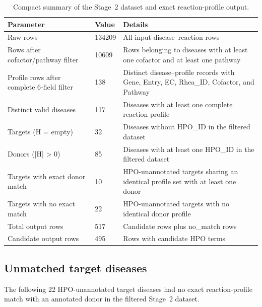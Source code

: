 \begin{table}[htbp]
\centering
\caption{Compact summary of the Stage~2 dataset and exact reaction-profile output.}
\label{tab:supp_dataset_summary}
\scriptsize
\setlength{\tabcolsep}{3pt}
\renewcommand{\arraystretch}{1.12}
\begin{tabularx}{\textwidth}{@{}p{}p{}X@{}}
\toprule
\textbf{Parameter} & \textbf{Value} & \textbf{Details}  \\
\midrule
Raw rows & 134209 & All input disease--reaction rows \\
Rows after cofactor/pathway filter & 10609 & Rows belonging to diseases with at least one cofactor and at least one pathway \\
Profile rows after complete 6-field filter & 138 & Distinct disease--profile records with Gene, Entry, EC, Rhea\_ID, Cofactor, and Pathway \\
Distinct valid diseases & 117 & Diseases with at least one complete reaction profile \\
Targets (H = empty) & 32 & Diseases without HPO\_ID in the filtered dataset \\
Donors (|H| > 0) & 85 & Diseases with at least one HPO\_ID in the filtered dataset \\
Targets with exact donor match & 10 & HPO-unannotated targets sharing an identical profile set with at least one donor \\
Targets with no exact match & 22 & HPO-unannotated targets with no identical donor profile \\
Total output rows & 517 & Candidate rows plus no\_match rows \\
Candidate output rows & 495 & Rows with candidate HPO terms \\
\bottomrule
\end{tabularx}
\end{table}

\subsection{Unmatched target diseases}
\label{supsec:no_match_targets}

The following 22 HPO-unannotated target diseases had no exact reaction-profile match with an annotated donor in the filtered Stage~2 dataset.

